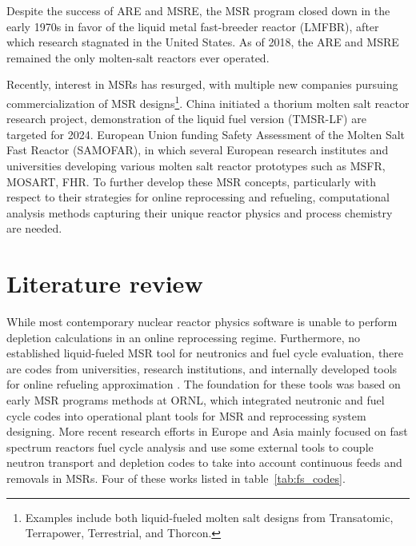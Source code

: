 Despite the success of \gls{ARE} and \gls{MSRE}, the \gls{MSR} program closed down in the early 1970s in favor of the liquid metal fast-breeder reactor (LMFBR),\cite{macpherson_molten_1985} after which research stagnated in the United States. As of 2018, the \gls{ARE} and \gls{MSRE} remained the only molten-salt reactors ever operated.

Recently, interest in \glspl{MSR} has resurged, with multiple new companies pursuing commercialization of \gls{MSR} designs\footnote{Examples include both liquid-fueled molten salt designs from Transatomic, Terrapower, Terrestrial, and Thorcon.}. China initiated a thorium molten salt reactor research project, demonstration of the liquid fuel version (TMSR-LF) are targeted for 2024. European Union funding Safety Assessment of the Molten Salt Fast Reactor (SAMOFAR), in which several European research institutes and universities developing various molten salt reactor prototypes such as \gls{MSFR}, \gls{MOSART}, \gls{FHR}.
To further develop these \gls{MSR} concepts, particularly with respect to their strategies for online reprocessing and refueling, computational analysis methods capturing their unique reactor physics and process chemistry are needed.

\section{Literature review}

While most contemporary nuclear reactor physics software is unable to perform depletion calculations in an online reprocessing regime. Furthermore, no established liquid-fueled \gls{MSR} tool for neutronics and fuel cycle evaluation, there are codes from universities, research institutions, and internally developed tools for online refueling approximation \cite{serp_molten_2014}. The foundation for these tools was based on early \gls{MSR} programs  methods at \gls{ORNL}, which integrated neutronic and fuel cycle codes \cite{bauman_rod:_1971} into operational plant tools \cite{kee_mrpp:_1976} for \gls{MSR} and reprocessing system designing. More recent research efforts in Europe and Asia mainly focused on fast spectrum reactors fuel cycle analysis and use some external tools to couple neutron transport and depletion codes to take into account continuous feeds and removals in \glspl{MSR}. Four of these works listed in table~\ref{tab:fs_codes}.

